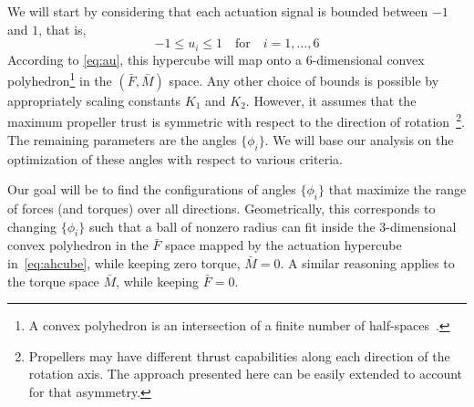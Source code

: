 \documentclass[review]{elsarticle}
\begin{document}

We will start by considering that each actuation signal is
bounded between $-1$ and $1$, that is,
\begin{equation}
  \label{eq:ahcube}
  -1 \leq u_i \leq 1 \quad \text{for} \quad i=1,\ldots,6
\end{equation}
According to \eqref{eq:au}, this hypercube will map onto a
6-dimensional convex polyhedron\footnote{A convex polyhedron is an
  intersection of a finite number of half-spaces~\cite{jeter86}.} in
the $(\bar{F}, \bar{M})$ space.  Any other choice of bounds is
possible by appropriately scaling constants $K_1$ and $K_2$.  However,
it assumes that the maximum propeller trust is symmetric with respect
to the direction of rotation~\footnote{Propellers may have different
thrust capabilities along each direction of the rotation axis. The
approach presented here can be easily extended to account for that asymmetry.}.
The remaining parameters are the angles
$\{\phi_i\}$. We will base our analysis on the optimization of these
angles with respect to various criteria.

Our goal will be to find the configurations of angles $\{\phi_i\}$
that maximize the range of forces (and torques) over all
directions.
Geometrically, this corresponds to changing $\{\phi_i\}$
such that a ball of nonzero radius can fit inside the 3-dimensional
convex polyhedron in the $\bar{F}$ space mapped by the actuation
hypercube in~\eqref{eq:ahcube}, while keeping zero torque,
$\bar{M}=0$. A similar reasoning applies to the torque space
$\bar{M}$, while keeping $\bar{F}=0$. 
\end{document}
